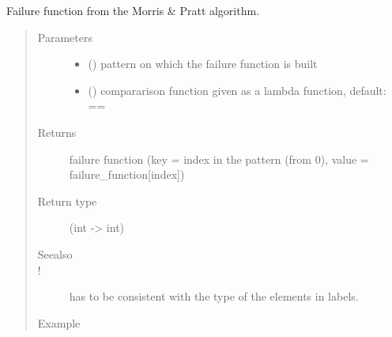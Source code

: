 \documentclass[letterpaper,10pt,english]{sphinxmanual}
\begin{document}
\begin{fulllineitems}
\label{\detokenize{index:PrefixIndexing.failure_function}}
Failure function from the Morris \& Pratt algorithm.
\begin{quote}\begin{description}
\item[{Parameters}] \leavevmode\begin{itemize}
\item {} 
 () \textendash{} pattern on which the failure function is built

\item {} 
 () \textendash{} compararison function given as a lambda function, default: ==

\end{itemize}

\item[{Returns}] \leavevmode
failure function (key = index in the pattern (from 0), value = failure\_function{[}index{]})

\item[{Return type}] \leavevmode
{} (int -\textgreater{} int)

\item[{Seealso}] \leavevmode
{} 

\item[{!}] \leavevmode
{} has to be consistent with the type of the elements in labels.

\item[{Example}] \leavevmode
\end{description}\end{quote}

\begin{sphinxVerbatim}[commandchars=\\\{\}]
\PYG{p}{[}\PYG{p}{]}        
\end{sphinxVerbatim}

\end{fulllineitems}
\end{document}
